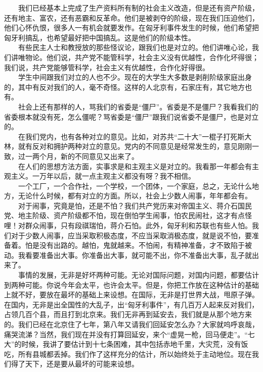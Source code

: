 \documentclass[cn,11pt,chinese]{elegantbook}
\begin{document}
　　我们已经基本上完成了生产资料所有制的社会主义改造，但是还有资产阶级，还有地主、富农，还有恶霸和反革命。他们是被剥夺的阶级，现在我们压迫他们，他们心怀仇恨，很多人一有机会就要发作。在匈牙利事件发生的时候，他们希望把匈牙利搞乱，也希望最好把中国搞乱。这是他们的阶级本性。\\
　　有些民主人士和教授放的那些怪议论，跟我们也是对立的。他们讲唯心论，我们讲唯物论。他们说，共产党不能管科学，社会主义没有优越性，合作化坏得很；我们说，共产党能够管科学，社会主义有优越性，合作化好得很。\\
　　学生中间跟我们对立的人也不少。现在的大学生大多数是剥削阶级家庭出身的，其中有反对我们的人，毫不奇怪。这样的人北京有，石家庄有，其它地方也有。\\
　　社会上还有那样的人，骂我们的省委是“僵尸”。省委是不是僵尸？我看我们的省委根本就没有死，怎么僵呢？骂省委是“僵尸”跟我们说省委不是僵尸，也是对立的。\\
　　在我们党内，也有各种对立的意见。比如，对苏共“二十大”一棍子打死斯大林，就有反对和拥护两种对立的意见。党内的不同意见是经常发生的，意见刚刚一致，过一两个月，新的不同意见又出来了。\\
　　在人们的思想方法方面，实事求是和主观主义是对立的。我看那一年都会有主观主义。一万年以后，就一点主观主义都没有呀？我不相信。\\
　　一个工厂，一个合作社，一个学校，一个团体，一个家庭，总之，无论什么地方，无论什么时候，都有对立的方面。所以，社会上少数人闹事，年年都会有。\\
　　对于闹事，究竟是怕，还是不怕？我们共产党历来对帝国主义、蒋介石国民党、地主阶级、资产阶级都不怕，现在倒怕学生闹事，怕农民闹社，这才有点怪哩！对群众闹事，只有段祺瑞怕，蒋介石怕。此外，匈牙利和苏联也有些人怕。我们对于少数人闹事，应当采取积极态度，不应当采取消极态度，就是说不怕，要准备着。怕是没有出路的。越怕，鬼就越来。不怕闹，有精神准备，才不致陷于被动。我看要准备出大事。你准备出大事，就可能不出，你不准备出大事，乱子就出来了。\\
　　事情的发展，无非是好坏两种可能。无论对国际问题，对国内问题，都要估计到两种可能。你说今年会太平，也许会太平。但是，你把工作放在这种估计的基础上就不好，要放在最坏的基础上来设想。在国际，无非是打世界大战，甩原子弹。在国内，无非是出全国性的大乱子，出“匈牙利事件”，有几百万人起来反对我们，占领几百个县，而且打到北京来。我们无非再到延安去，我们就是从那个地方来的。我们已经在北京住了七年，第八年又请我们回延安怎么办？大家就呜呼哀哉，痛哭流涕？当然，我们现在并没有打算回延安，来个“虚晃一枪，回马便走”。“七大”的时候，我讲了要估计到十七条困难，其中包括赤地千里，大灾荒，没有饭吃，所有县城都丢掉。我们作了这样充分的估计，所以始终处于主动地位。现在我们得了天下，还是要从最坏的可能来设想。\\
\end{document}
